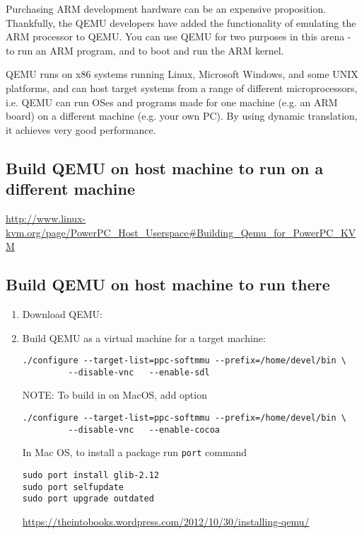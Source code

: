 Purchasing ARM development hardware can be an expensive proposition. Thankfully,
the QEMU developers have added the functionality of emulating the ARM processor
to QEMU. You can use QEMU for two purposes in this arena - to run an ARM
program, and to boot and run the ARM kernel.

QEMU runs on x86 systems running Linux, Microsoft Windows, and some UNIX
platforms, and can host target systems from a range of different
microprocessors, i.e.  QEMU can run OSes and programs made for one machine (e.g.
an ARM board) on a different machine (e.g. your own PC). By using dynamic
translation, it achieves very good performance.

\subsection{Build QEMU on host machine to run on a different machine}

\url{http://www.linux-kvm.org/page/PowerPC_Host_Userspace#Building_Qemu_for_PowerPC_KVM}


\subsection{Build QEMU on host machine to run there}


\begin{enumerate}
  \item Download QEMU:
    
  \item Build QEMU as a virtual machine for a target machine:

\begin{verbatim}
./configure --target-list=ppc-softmmu --prefix=/home/devel/bin \
         --disable-vnc   --enable-sdl
\end{verbatim}


NOTE: To build in on MacOS, add option
\begin{verbatim}
./configure --target-list=ppc-softmmu --prefix=/home/devel/bin \
         --disable-vnc   --enable-cocoa 
\end{verbatim}
In Mac OS, to install a package run \verb!port! command
\begin{verbatim}
sudo port install glib-2.12
sudo port selfupdate
sudo port upgrade outdated
\end{verbatim}
\url{https://theintobooks.wordpress.com/2012/10/30/installing-qemu/}
\end{enumerate}



